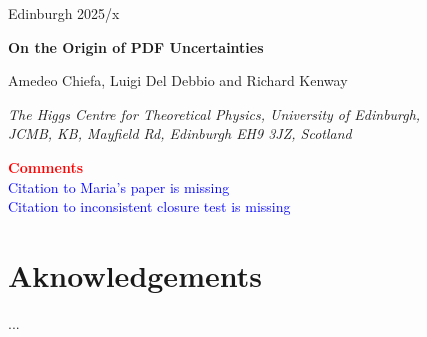 \documentclass[11pt,a4paper]{article}
\begin{document}
\vspace{-2.0cm}
\begin{flushright}
Edinburgh 2025/x
\end{flushright}
\vspace{0.3cm}

\begin{center}
  {\Large \bf On the Origin of PDF Uncertainties}
  \vspace{1.1cm}

  Amedeo Chiefa, Luigi Del Debbio and Richard Kenway

  \vspace{0.2cm}

  {\it \small
    The Higgs Centre for Theoretical Physics, University of Edinburgh,\\
    JCMB, KB, Mayfield Rd, Edinburgh EH9 3JZ, Scotland\\[0.1cm]
  }
  \vspace{0.7cm}

  {\Large \bf \textcolor{red}{Comments}}\\
  \textcolor{blue}{
    Citation to Maria's paper is missing\\
    Citation to inconsistent closure test is missing\\
  }
\end{center}

\begin{abstract}
  Parton Distribution Functions (PDFs) play a crucial role in describing
  experimental data at hadron colliders and provide insight into proton
  structure. As the LHC enters an era of high-precision measurements, a robust
  PDF determination with a reliable uncertainty quantification has become
  increasingly important to match the experimental precision. The NNPDF
  collaboration has pioneered the use of Machine Learning (ML) techniques for PDF
  determination. In this work, we develop a theoretical framework based on the
  Neural Tangent Kernel (NTK) to analyze the training dynamics of Neural
  Networks. This approach allows us to derive, under certain assumptions, an
  analytical description of how the neural network evolves during training,
  enabling us to better understand the NNPDF methodology and its dependence on
  the underlying model architecture. Notably, we demonstrate that our results
  contrast, to some extent, with the standard picture of the \textit{lazy training}
  regime commonly discussed in the ML community.
\end{abstract}

\tableofcontents
\clearpage







\section*{Aknowledgements}
...

\newpage

\appendix






\end{document}
